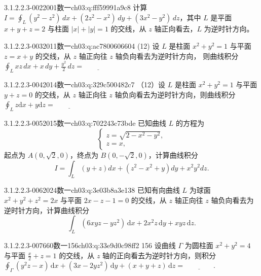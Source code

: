 \begin{q}{3.1.2.2.3-002}{2001数一}{ch03:q:fff59991a9c8}
计算 $\displaystyle I=\oint_L (y^2-z^2)\,dx+(2z^2-x^2)\,dy+(3x^2-y^2)\,dz$，其中 $L$ 是平面 $x+y+z=2$ 与柱面 $|x|+|y|=1$ 的交线，从 $z$ 轴正向看去，$L$ 为逆时针方向。
\end{q}

\begin{q}{3.1.2.2.3-003}{2011数一}{ch03:q:ac7800606604}
(12) 设 $L$ 是柱面 $x^2+y^2=1$ 与平面 $z=x+y$ 的交线，从 $z$ 轴正向往 $z$ 轴负向看去为逆时针方向，
则曲线积分 $\displaystyle \oint_L xz\,dx+x\,dy+\frac{y^2}{2}\,dz=\underline{\hspace{4em}}$
\end{q}

\begin{q}{3.1.2.2.3-004}{2014数一}{ch03:q:329c500482c7}
（12）设 $L$ 是柱面 $x^2+y^2=1$ 与平面 $y+z=0$ 的交线，从 $z$ 轴正向往 $z$ 轴负向看去为逆时针方向，则曲线积分 $\displaystyle \oint_L z\mathrm{d}x + y\mathrm{d}z = \underline{\hspace{4em}}$
\end{q}

\begin{q}{3.1.2.2.3-005}{2015数一}{ch03:q:702243c73bde}
已知曲线 $L$ 的方程为
\[
\begin{cases}
z=\sqrt{2-x^2-y^2},\\
z=x,
\end{cases}
\]
起点为 $A(0,\sqrt{2},0)$，终点为 $B(0,-\sqrt{2},0)$，计算曲线积分
\[
I=\int_L (y+z)dx+(z^2-x^2+y)dy+x^2y^2dz.
\]
\end{q}

\begin{q}{3.1.2.2.3-006}{2024数一}{ch03:q:3e03b8a3e138}
已知有向曲线 $L$ 为球面 $x^2+y^2+z^2=2x$ 与平面 $2x-z-1=0$ 的交线，从 $z$ 轴正向往 $z$ 轴负向看去为逆时针方向，计算曲线积分
\[
\int_L (6xyz-yz^2)\,\mathrm{d}x+2x^2z\,\mathrm{d}y+xyz\,\mathrm{d}z.
\]
\end{q}

\begin{q}{3.1.2.2.3-007}{660数一156}{ch03:q:33e9d0c98ff2}
156 设曲线 $\Gamma$ 为圆柱面 $x^2+y^2=4$ 与平面 $\frac{x}{2}+z=1$ 的交线，从 $z$ 轴的正向看去为逆时针方向，则积分 $\displaystyle \oint_{\Gamma}(y^2z-x)\,\mathrm{d}x+(3x-2yz^2)\,\mathrm{d}y+(x+y+z)\,\mathrm{d}z=\underline{\hspace{4em}}.$
\end{q}

